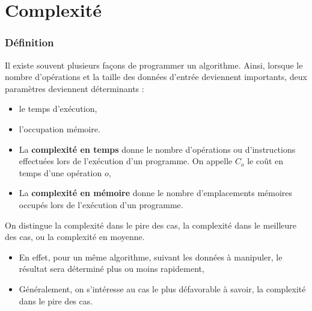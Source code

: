 

\section{Complexité} 

\begin{frame}[fragile]
\frametitle{Définition}

Il existe souvent plusieurs façons de programmer un algorithme. Ainsi, lorsque le nombre d'opérations et la taille des données d'entrée deviennent importants, deux paramètres deviennent déterminants : 
\begin{itemize}
 \item le temps d'exécution,
 \item l'occupation mémoire.
\end{itemize}

\begin{itemize}
 \item La \textbf{complexité en temps} donne le nombre d'opérations ou d'instructions effectuées lors de l'exécution d'un programme. On appelle $C_o$ le coût en temps d'une opération $o$,
 \item La \textbf{complexité en mémoire} donne le nombre d'emplacements mémoires occupés lors de l'exécution d'un
programme.
\end{itemize}

On distingue la complexité dans le pire des cas, la complexité dans le meilleure des cas, ou la complexité en moyenne.

\begin{itemize}
 \item En effet, pour un même algorithme, suivant les données à manipuler, le résultat sera déterminé plus ou moins
rapidement,
\item Généralement, on s'intéresse au cas le plus défavorable à savoir, la complexité dans le pire des cas.
\end{itemize}
\end{frame}

